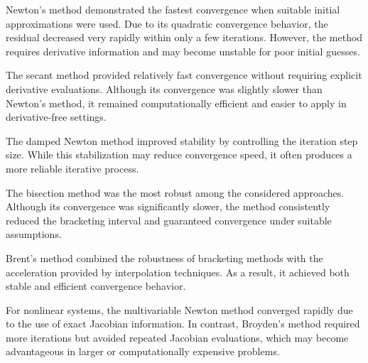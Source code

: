 Newton's method demonstrated the fastest convergence when suitable initial approximations were used. Due to its quadratic convergence behavior, the residual decreased very rapidly within only a few iterations. However, the method requires derivative information and may become unstable for poor initial guesses.

The secant method provided relatively fast convergence without requiring explicit derivative evaluations. Although its convergence was slightly slower than Newton's method, it remained computationally efficient and easier to apply in derivative-free settings.

The damped Newton method improved stability by controlling the iteration step size. While this stabilization may reduce convergence speed, it often produces a more reliable iterative process.

The bisection method was the most robust among the considered approaches. Although its convergence was significantly slower, the method consistently reduced the bracketing interval and guaranteed convergence under suitable assumptions.

Brent's method combined the robustness of bracketing methods with the acceleration provided by interpolation techniques. As a result, it achieved both stable and efficient convergence behavior.

For nonlinear systems, the multivariable Newton method converged rapidly due to the use of exact Jacobian information. In contrast, Broyden's method required more iterations but avoided repeated Jacobian evaluations, which may become advantageous in larger or computationally expensive problems.